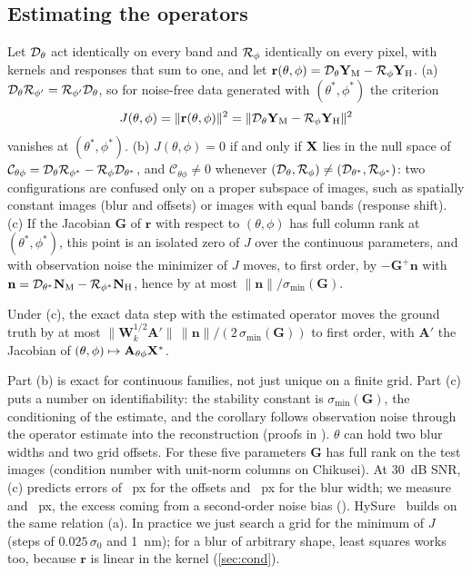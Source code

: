 \documentclass[10pt,twocolumn,letterpaper]{article}
\begin{document}
\subsection{Estimating the operators}
\label{sec:ident}
\begin{theorem}
\label{thm:ident}
Let $\mathcal{D}_\theta$ act identically on every band and $\mathcal{R}_\phi$ identically on every pixel, with kernels and responses that sum to one, and let $\mathbf{r}(\theta,\phi)=\mathcal{D}_\theta\mathbf{Y}_{\mathrm{M}}-\mathcal{R}_\phi\mathbf{Y}_{\mathrm{H}}$. (a) $\mathcal{D}_\theta\mathcal{R}_{\phi'}=\mathcal{R}_{\phi'}\mathcal{D}_\theta$, so for noise-free data generated with $(\theta^*,\phi^*)$ the criterion
\begin{equation}
J(\theta,\phi)=\|\mathbf{r}(\theta,\phi)\|^2=\|\mathcal{D}_\theta\mathbf{Y}_{\mathrm{M}}-\mathcal{R}_\phi\mathbf{Y}_{\mathrm{H}}\|^2
\label{eq:J}
\end{equation}
vanishes at $(\theta^*,\phi^*)$. (b) $J(\theta,\phi)=0$ if and only if $\mathbf{X}$ lies in the null space of $\mathcal{C}_{\theta\phi}=\mathcal{D}_\theta\mathcal{R}_{\phi^*}-\mathcal{R}_\phi\mathcal{D}_{\theta^*}$, and $\mathcal{C}_{\theta\phi}\neq0$ whenever $(\mathcal{D}_\theta,\mathcal{R}_\phi)\neq(\mathcal{D}_{\theta^*},\mathcal{R}_{\phi^*})$: two configurations are confused only on a proper subspace of images, such as spatially constant images (blur and offsets) or images with equal bands (response shift). (c) If the Jacobian $\mathbf{G}$ of $\mathbf{r}$ with respect to $(\theta,\phi)$ has full column rank at $(\theta^*,\phi^*)$, this point is an isolated zero of $J$ over the continuous parameters, and with observation noise the minimizer of $J$ moves, to first order, by $-\mathbf{G}^{+}\mathbf{n}$ with $\mathbf{n}=\mathcal{D}_{\theta^*}\mathbf{N}_{\mathrm{M}}-\mathcal{R}_{\phi^*}\mathbf{N}_{\mathrm{H}}$, hence by at most $\|\mathbf{n}\|/\sigma_{\min}(\mathbf{G})$.
\end{theorem}
\begin{corollary}
\label{cor:chain}
Under (c), the exact data step with the estimated operator moves the ground truth by at most $\|\mathbf{W}_k^{1/2}\mathbf{A}'\|\,\|\mathbf{n}\|/(2\,\sigma_{\min}(\mathbf{G}))$ to first order, with $\mathbf{A}'$ the Jacobian of $(\theta,\phi)\mapsto\mathbf{A}_{\theta\phi}\mathbf{X}^*$.
\end{corollary}
Part (b) is exact for continuous families, not just unique on a finite grid. Part (c) puts a number on identifiability: the stability constant is $\sigma_{\min}(\mathbf{G})$, the conditioning of the estimate, and the corollary follows observation noise through the operator estimate into the reconstruction (proofs in \supp). $\theta$ can hold two blur widths and two grid offsets. For these five parameters $\mathbf{G}$ has full rank on the test images (condition number  with unit-norm columns on Chikusei). At 30~dB SNR, (c) predicts errors of ~px for the offsets and ~px for the blur width; we measure  and ~px, the excess coming from a second-order noise bias (\supp). HySure~\cite{simoes2015hysure} builds on the same relation (a). In practice we just search a grid for the minimum of $J$ (steps of $0.025\,\sigma_0$ and 1~nm); for a blur of arbitrary shape, least squares works too, because $\mathbf{r}$ is linear in the kernel (\cref{sec:cond}).
\end{document}
